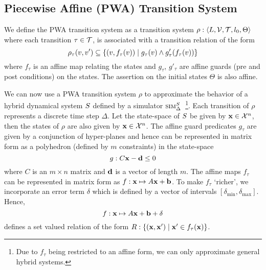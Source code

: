\subsection{Piecewise Affine (PWA) Transition System}

We define the PWA transition system as a transition system
$\rho:\left\langle L,\mathcal{V},\mathcal{T}, l_0,\Theta \right \rangle$
where each transition $\tau \in \mathcal{T}$, is associated with a
transition relation of the form
\[
    \rho_{\tau}(v,v') \subseteq \{(v,f_{\tau}(v)) \;|\; g_\tau(v) \land g'_\tau(f_{\tau}(v))\}
\]
where $f_{\tau}$ is an affine map relating the states and $g_{\tau}$,
$g'_{\tau}$ are affine guards (pre and post conditions) on the states.
The assertion on the initial states $\Theta$ is also affine.

We can now use a PWA transition system $\rho$ to approximate the
behavior of a hybrid dynamical system $S$ defined by a simulator
$\mbox{\sc sim}_\Delta^{S}$~\footnote{Due to $f_\tau$ being restricted to an affine
form, we can only approximate general hybrid systems.}. Each
transition of $\rho$ represents a discrete time step $\Delta$. Let the
state-space of $S$ be given by $\mathbf{x}\in\mathcal{X}^n$, then the
states of $\rho$ are also given by $\mathbf{x}\in\mathcal{X}^n$. The affine guard
predicates $g_\tau$ are given by a conjunction of hyper-planes and
hence can be represented in matrix form as a polyhedron (defined by
$m$ constraints) in the state-space
\[
g:C\mathbf{x} - \mathbf{d} \le 0
\]
where $C$ is an $m \times n$ matrix and $\mathbf{d}$ is a vector of length
$m$. The affine maps $f_\tau$ can be represented in matrix form as
$f:\mathbf{x} \mapsto A\mathbf{x}+\mathbf{b}$. To make $f_\tau$ `richer', we incorporate
an error term $\delta$ which is defined by a vector of intervals
$[\delta_{\min},\delta_{\max}]$. Hence,
\[
f:\mathbf{x} \mapsto A\mathbf{x} + \mathbf{b} + \delta
\]
defines a set valued relation of the form $R:\{(\mathbf{x},\mathbf{x}') \;|\; \mathbf{x}'
\in f_\tau(\mathbf{x})\}$.



